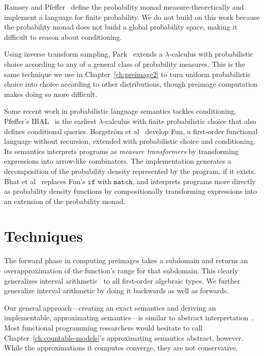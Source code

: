 Ramsey and Pfeffer~\cite{cit:ramsey-2002popl-stochastic-short} define the probability monad measure-theoretically and implement a language for finite probability.
We do not build on this work because the probability monad does not build a global probability space, making it difficult to reason about conditioning.

Using inverse transform sampling, Park~\cite{cit:park-2008toplas-prob} extends a $\lambda$-calculus with probabilistic choice according to any of a general class of probability measures.
This is the same technique we use in Chapter~\ref{ch:preimage2} to turn uniform probabilistic choice into choice according to other distributions, though preimage computation makes doing so more difficult.

Some recent work in probabilistic language semantics tackles conditioning.
Pfeffer's IBAL~\cite{cit:pfeffer-2007chapter-ibal} is the earliest $\lambda$-calculus with finite probabilistic choice that also defines conditional queries.
Borgstr\"om et al~\cite{cit:borgstrom-2011esop-measure-transformer} develop Fun, a first-order functional language without recursion, extended with probabilistic choice and conditioning.
Its semantics interprets programs as \emph{measure transformers} by transforming expressions into arrow-like combinators.
The implementation generates a decomposition of the probability density represented by the program, if it exists.
Bhat et al~\cite{cit:bhat-2013etaps-densities} replaces Fun's $\mathtt{if}$ with $\mathtt{match}$, and interprets programs more directly as probability density functions by compositionally transforming expressions into an extension of the probability monad.

\section{Techniques}

The forward phase in computing preimages takes a subdomain and returns an overapproximation of the function's range for that subdomain.
This clearly generalizes interval arithmetic~\cite{cit:kearfott-1996eb-interval} to all first-order algebraic types.
We further generalize interval arithmetic by doing it backwards as well as forwards.

Our general approach---creating an exact semantics and deriving an implementable, approximating semantics---is similar to abstract interpretation~\cite{cit:cousot-1977popl-abstract-interpretation}.
Most functional programming researchers would hesitate to call Chapter~\ref{ch:countable-models}'s approximating semantics abstract, however.
While the approximations it computes converge, they are not conservative.

